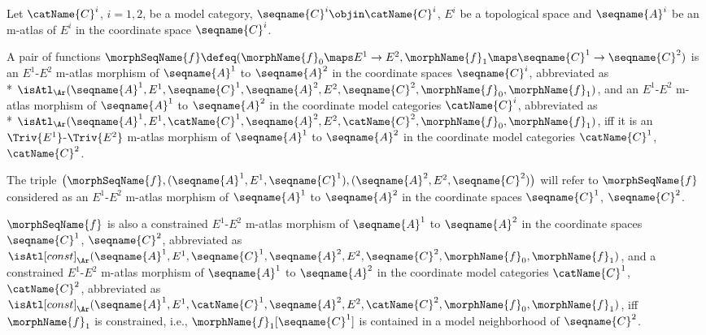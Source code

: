 \documentclass{article}
\begin{document}
\begin{definition}
\label{def:M-ATLmorphtop}
Let $\catName{C}^i$, $i=1,2$, be a model category,
$\seqname{C}^i \objin \catName{C}^i$, $E^i$ be a topological space and
$\seqname{A}^i$ be an m-atlas of $E^i$ in the coordinate space
$\seqname{C}^i$.

A pair of functions
$
  \morphSeqName{f} \defeq
  (
    \morphName{f}_0 \maps E^1 \to E^2,
    \morphName{f}_1 \maps \seqname{C}^1 \to \seqname{C}^2
  )
$
is an $E^1$-$E^2$ m-atlas morphism of
$\seqname{A}^1$ to $\seqname{A}^2$ in the coordinate spaces
$\seqname{C}^i$, abbreviated as \\*
$
  \isAtl_\Ar
    (
      \seqname{A}^1,
      E^1,
      \seqname{C}^1,
      \seqname{A}^2,
      E^2,
      \seqname{C}^2,
      \morphName{f}_0,
      \morphName{f}_1
    )
$,
and an $E^1$-$E^2$ m-atlas morphism of $\seqname{A}^1$ to $\seqname{A}^2$
in the coordinate model categories $\catName{C}^i$, abbreviated as \\*
$
  \isAtl_\Ar
    (
      \seqname{A}^1,
      E^1,
      \catName{C}^1,
      \seqname{A}^2,
      E^2,
      \catName{C}^2,
      \morphName{f}_0,
      \morphName{f}_1
    )
$,
iff it is an $\Triv{E^1}$-$\Triv{E^2}$ m-atlas morphism of
$\seqname{A}^1$ to $\seqname{A}^2$ in the coordinate model categories
$\catName{C}^1$, $\catName{C}^2$.

The triple
$
  \bigl (
    \morphSeqName{f},
    (\seqname{A}^1, E^1, \seqname{C}^1),
    (\seqname{A}^2, E^2, \seqname{C}^2)
  \bigr )
$
will refer to $\morphSeqName{f}$ considered as an $E^1$-$E^2$ m-atlas
morphism of $\seqname{A}^1$ to $\seqname{A}^2$ in the coordinate
spaces $\seqname{C}^1$, $\seqname{C}^2$.

$\morphSeqName{f}$ is also a constrained $E^1$-$E^2$ m-atlas morphism of
$\seqname{A}^1$ to $\seqname{A}^2$ in the coordinate spaces
$\seqname{C}^1$, $\seqname{C}^2$, abbreviated as
$
  \isAtl[const]_\Ar
    (
      \seqname{A}^1,
      E^1,
      \seqname{C}^1,
      \seqname{A}^2,
      E^2,
      \seqname{C}^2,
      \morphName{f}_0,
      \morphName{f}_1
    )
$,
and a constrained $E^1$-$E^2$ m-atlas morphism of $\seqname{A}^1$ to $\seqname{A}^2$
in the coordinate model categories $\catName{C}^1$, $\catName{C}^2$, abbreviated as
$
  \isAtl[const]_\Ar
    (
      \seqname{A}^1,
      E^1,
      \catName{C}^1,
      \seqname{A}^2,
      E^2,
      \catName{C}^2,
      \morphName{f}_0,
      \morphName{f}_1
    )
$,
iff $\morphName{f}_1$ is constrained, i.e.,
$\morphName{f}_1[\seqname{C}^1]$ is contained in a model neighborhood of
$\seqname{C}^2$.
\end{definition}
\end{document}
